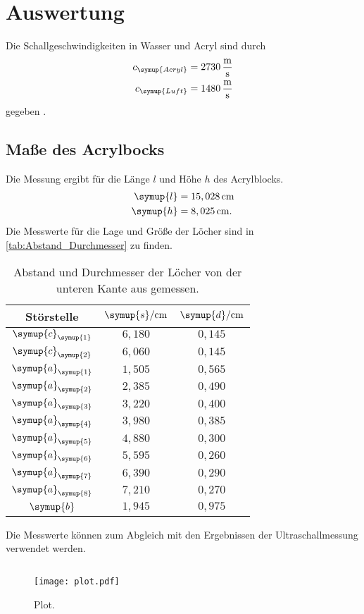 \section{Auswertung}
\label{sec:Auswertung}
Die Schallgeschwindigkeiten in Wasser und Acryl sind durch
\begin{align*}
  c_{\symup{Acryl}} &= 2730\,\unit{\meter\per\second}\\
  c_{\symup{Luft}}  &= 1480\,\unit{\meter\per\second}
\end{align*}
gegeben \cite{schallgeschwindigkeit}.

\subsection{Maße des Acrylbocks}
Die Messung ergibt für die Länge $l$ und Höhe $h$ des Acrylblocks.
\begin{align*}
  \symup{l} &= 15,028\,\unit{\centi\meter}\\
  \symup{h} &= 8,025\,\unit{\centi\meter}.
\end{align*}
Die Messwerte für die Lage und Größe der Löcher sind in \autoref{tab:Abstand_Durchmesser} zu finden.
\begin{table}
  \centering
  \begin{tabular}{c c c}
    \toprule
    Störstelle & $\symup{s}/\unit{\centi\meter}$ & $\symup{d}/\unit{\centi\meter}$\\
    \midrule
    $\symup{c}_{\symup{1}}$ & $6,180$ & $0,145$ \\
    $\symup{c}_{\symup{2}}$ & $6,060$ & $0,145$ \\
    $\symup{a}_{\symup{1}}$ & $1,505$ & $0,565$ \\
    $\symup{a}_{\symup{2}}$ & $2,385$ & $0,490$ \\
    $\symup{a}_{\symup{3}}$ & $3,220$ & $0,400$ \\
    $\symup{a}_{\symup{4}}$ & $3,980$ & $0,385$ \\
    $\symup{a}_{\symup{5}}$ & $4,880$ & $0,300$ \\
    $\symup{a}_{\symup{6}}$ & $5,595$ & $0,260$ \\
    $\symup{a}_{\symup{7}}$ & $6,390$ & $0,290$ \\
    $\symup{a}_{\symup{8}}$ & $7,210$ & $0,270$ \\
    $\symup{b}            $ & $1,945$ & $0,975$ \\
    \bottomrule
  \end{tabular}
  \caption{Abstand und Durchmesser der Löcher von der unteren Kante aus gemessen.}
  \label{tab:Abstand_Durchmesser}
\end{table}
Die Messwerte können zum Abgleich mit den Ergebnissen der Ultraschallmessung verwendet werden.

\subsection{}

\begin{figure}
  \centering
  \texttt{[image: plot.pdf]}
  \caption{Plot.}
  \label{fig:plot}
\end{figure}

